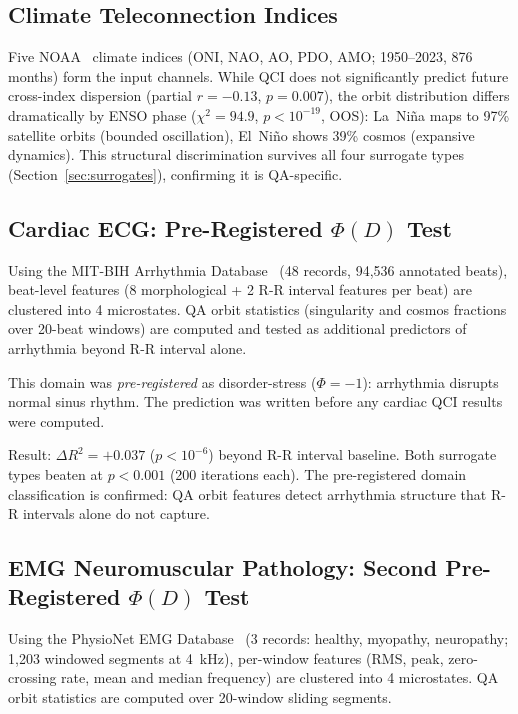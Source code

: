 \documentclass[11pt,a4paper]{article}
\begin{document}
\subsection{Climate Teleconnection Indices}

Five NOAA~\cite{noaa} climate indices (ONI, NAO, AO, PDO, AMO; 1950--2023, 876 months)
form the input channels. While QCI does not significantly predict future
cross-index dispersion (partial $r = -0.13$, $p = 0.007$), the orbit
distribution differs dramatically by ENSO phase
($\chi^2 = 94.9$, $p < 10^{-19}$, OOS):
La~Ni\~{n}a maps to 97\% satellite orbits (bounded oscillation),
El~Ni\~{n}o shows 39\% cosmos (expansive dynamics).
This structural discrimination survives all four surrogate types
(Section~\ref{sec:surrogates}), confirming it is QA-specific.

\subsection{Cardiac ECG: Pre-Registered $\Phi(D)$ Test}

Using the MIT-BIH Arrhythmia Database~\cite{chbmit} (48 records, 94,536
annotated beats), beat-level features (8 morphological + 2 R-R interval
features per beat) are clustered into 4 microstates. QA orbit statistics
(singularity and cosmos fractions over 20-beat windows) are computed and
tested as additional predictors of arrhythmia beyond R-R interval alone.

This domain was \emph{pre-registered} as disorder-stress ($\Phi = -1$):
arrhythmia disrupts normal sinus rhythm. The prediction was written before
any cardiac QCI results were computed.

Result: $\Delta R^2 = +0.037$ ($p < 10^{-6}$) beyond R-R interval baseline.
Both surrogate types beaten at $p < 0.001$ (200 iterations each).
The pre-registered domain classification is confirmed: QA orbit features
detect arrhythmia structure that R-R intervals alone do not capture.

\subsection{EMG Neuromuscular Pathology: Second Pre-Registered $\Phi(D)$ Test}

Using the PhysioNet EMG Database~\cite{emgdb} (3 records: healthy, myopathy, neuropathy;
1,203 windowed segments at 4~kHz), per-window features (RMS, peak, zero-crossing
rate, mean and median frequency) are clustered into 4 microstates. QA orbit
statistics are computed over 20-window sliding segments.
\end{document}
